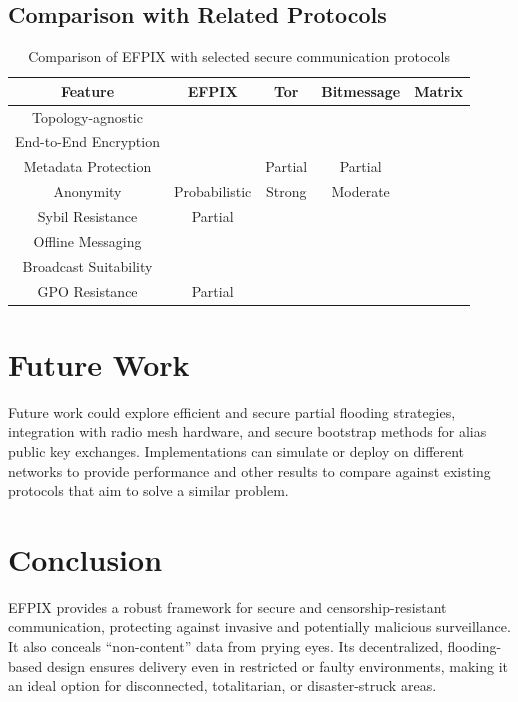 \documentclass{article}
\newcommand{\cmark}{\ding{51}}
\newcommand{\xmark}{\ding{55}}
\begin{document}
\subsection{Comparison with Related Protocols}

\begin{table}[h]
\centering
\begin{tabular}{|c|c|c|c|c|}
\hline
\textbf{Feature} & \textbf{EFPIX} & \textbf{Tor \cite{tor2004}} & \textbf{Bitmessage \cite{bitmessage2012}} & \textbf{Matrix \cite{matrix2014}} \\
\hline
Topology-agnostic      & \cmark & \xmark & \cmark & \xmark \\
End-to-End Encryption  & \cmark & \cmark & \cmark & \cmark \\
Metadata Protection    & \cmark & Partial & Partial & \xmark \\
Anonymity              & Probabilistic & Strong & Moderate & \xmark \\
Sybil Resistance       & Partial & \xmark & \xmark & \xmark \\
Offline Messaging      & \cmark & \xmark & \cmark & \cmark \\
Broadcast Suitability  & \cmark & \xmark & \cmark & \xmark \\
GPO Resistance         & Partial & \xmark & \xmark & \xmark \\
\hline
\end{tabular}
\caption{Comparison of EFPIX with selected secure communication protocols}
\end{table}

\section{Future Work}
Future work could explore efficient and secure partial flooding strategies, integration with radio mesh hardware, and secure bootstrap methods for alias public key exchanges. Implementations can simulate or deploy on different networks to provide performance and other results to compare against existing protocols that aim to solve a similar problem. 

\section{Conclusion}
EFPIX provides a robust framework for secure and censorship-resistant communication, protecting against invasive and potentially malicious surveillance. It also conceals “non-content” data from prying eyes. Its decentralized, flooding-based design ensures delivery even in restricted or faulty environments, making it an ideal option for disconnected, totalitarian, or disaster-struck areas.
\end{document}
